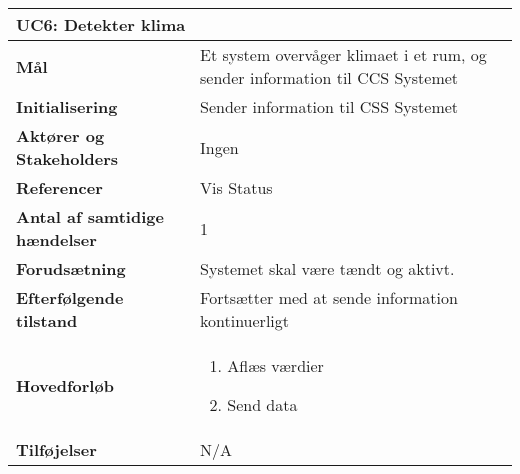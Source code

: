 \begin{table}[H] \centering
\begin{tabular}{|p{6cm}|p{8cm}|}
	\hline
\multicolumn{2}{|l|}{\textbf{UC6: Detekter klima}} \\\hline
\textbf{Mål} &
Et system overvåger klimaet i et rum, og sender information til CCS Systemet  \\\hline

\textbf{Initialisering} &
Sender information til CSS Systemet \\\hline
 
\textbf{Aktører og Stakeholders} &
Ingen \\\hline

\textbf{Referencer} &
Vis Status \\\hline

\textbf{Antal af samtidige hændelser} &
1 \\\hline

\textbf{Forudsætning} &
Systemet skal være tændt og aktivt. \\\hline

\textbf{Efterfølgende tilstand} &
Fortsætter med at sende information kontinuerligt \\\hline

\textbf{Hovedforløb} &
\begin{enumerate}

\item Aflæs værdier
\item Send data
\end{enumerate}   
 \\\hline
 
\textbf{Tilføjelser} &
N/A \\\hline
	\end{tabular}
	\label{UC6} 
\end{table}